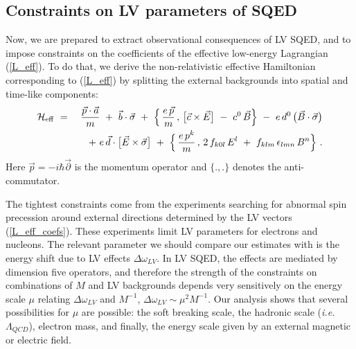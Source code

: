 \documentclass[12pt]{revtex4}
\begin{document}
\subsection{Constraints on LV parameters of SQED}


Now, we are prepared to extract observational consequences of LV SQED,
and to impose constraints on the coefficients of the effective low-energy
Lagrangian (\ref{L_eff}). To do that, we derive the non-relativistic
effective Hamiltonian corresponding to (\ref{L_eff}) by splitting the
external backgrounds into spatial and  time-like components: 
\begin{eqnarray}
        \mathcal{H}_{\rm eff} 
        & ~=~ &
        \frac{\vec{p} \cdot \vec{a}}
                  {m}
        ~+~
        \vec{b} \cdot \vec{\sigma}
        ~+~
        \Big\{\, 
                \frac{e\, \vec{p}}
                    {m}
                \, ,\, 
                \big[ \vec{c} \times \vec{E} \big]
                ~-~
                c^0\, \vec{B} 
        \Big\}
        ~-~ 
        e \, d^0 \, \big( \vec{B} \cdot \vec{\sigma} \big)
\nonumber        \\
\label{H_eff}
        & &
        ~+~
        e\, \vec{d} \cdot
        \big[ \vec{E} \times \vec{\sigma} \big]
        ~+~
        \Big\{\, 
                \frac{e\, p^k}
                    {m}
                \,,\, 
                2\, f_{k0l}\, E^l 
                ~+~
                f_{klm} \,\epsilon_{lmn}\, 
                B^n
        \Big\}~. 
\end{eqnarray}
%
Here $ \vec{p} = - i \hbar \vec{\partial} $ is the momentum operator
and $\{.,.\}$ denotes the anti-commutator. 


The tightest constraints come from the experiments searching for 
abnormal spin precession around external directions determined by the
LV vectors (\ref{L_eff_coefs}). These experiments limit LV parameters 
for electrons and nucleons. The relevant parameter we should compare 
our estimates with is the energy shift due to LV effects 
$\Delta \omega_{LV}$. In LV SQED, the effects are mediated by
dimension five operators, and therefore the strength of the
constraints on combinations of $M$ and LV backgrounds depends very
sensitively on the energy scale $\mu$ relating $\Delta \omega_{LV}$
and $M^{-1}$, $\Delta \omega_{LV} \sim \mu^2 M^{-1}$. Our analysis
shows that several possibilities for $\mu$ are possible: the soft
breaking scale, the hadronic scale ({\em i.e.}\ $\Lambda_{QCD}$), electron
mass, and finally, the energy scale given by an external magnetic or
electric field. 
\end{document}
